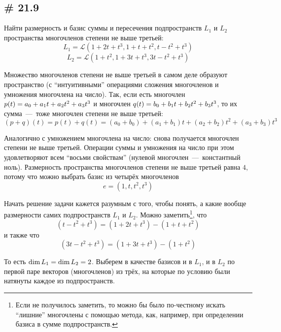 \documentclass[a4paper,12pt]{article}
\begin{document}
  
  \subsection{\# 21.9}
  
  Найти размерность и базис суммы и пересечения подпространств $L_1$ и $L_2$ пространства многочленов степени не выше третьей:
  \[
    L_1 = \mathcal L(1 + 2t + t^3, 1 + t + t^2, t - t^2 + t^3)
  \]
  \[
    L_2 = \mathcal L(1 + t^2, 1 + 3t + t^3, 3t - t^2 + t^3)
  \]
  
  \begin{solution}
    Множество многочленов степени не выше третьей в самом деле образуют пространство (с ``интуитивными'' операциями сложения многочленов и умножения многочлена на число).
    Так, если есть многочлен $p(t) \hm= a_0 \hm+ a_1 t \hm+ a_2 t^2 \hm+ a_3 t^3$ и многочлен $q(t) \hm= b_0 \hm+ b_1 t \hm+ b_2 t^2 \hm+ b_3 t^3$, то их сумма~---~тоже многочлен степени не выше третьей:
    \[
      (p + q)(t) = p(t) + q(t) = (a_0 + b_0) + (a_1 + b_1) t + (a_2 + b_2) t^2 + (a_3 + b_3) t^3
    \]
    
    Аналогично с умножением многочлена на число: снова получается многочлен степени не выше третьей.
    Операции суммы и умножения на число при этом удовлетворяют всем ``восьми свойствам'' (нулевой многочлен~---~константный ноль).
    Размерность пространства многочленов степени не выше третьей равна $4$, потому что можно выбрать базис из четырёх многочленов
    \[
      e = (1, t, t^2, t^3)
    \]
    
    Начать решение задачи кажется разумным с того, чтобы понять, а какие вообще размерности самих подпространств $L_1$ и $L_2$.
    Можно заметить\footnote{Если не получилось заметить, то можно бы было по-честному искать ``лишние'' многочлены с помощью метода, как, например, при определении базиса в сумме подпространств.}, что
    \[
      (t - t^2 + t^3) = (1 + 2t + t^3) - (1 + t + t^2)
    \]
    и также что
    \[
      (3t - t^2 + t^3) = (1 + 3t + t^3) - (1 + t^2)
    \]
    
    То есть $\dim L_1 \hm= \dim L_2 \hm= 2$.
    Выберем в качестве базисов и в $L_1$, и в $L_2$ по первой паре векторов (многочленов) из трёх, на которые по условию были натянуты каждое из подпространств.
    

\end{solution}
\end{document}
